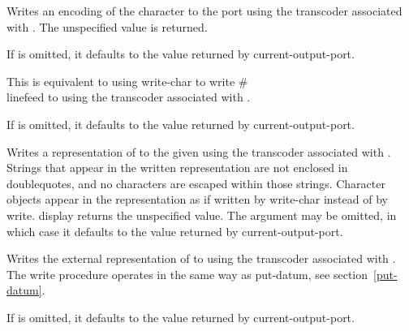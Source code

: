 \begin{entry}{%
}

Writes an encoding of the character  to the port using the
transcoder associated with . The unspecified value is
returned.

If  is omitted, it defaults to the value returned by
{\cf current-output-port}.
\end{entry}

\begin{entry}{%
}

This is equivalent to using {\cf write-char} to write {\cf \#\\linefeed}
to  using the transcoder associated with .

If  is omitted, it defaults to the value returned by
{\cf current-output-port}.
\end{entry}

\begin{entry}{%
}

Writes a representation of  to the given  using the
transcoder associated with .  Strings that appear in
the written representation are not enclosed in doublequotes, and no
characters are escaped within those strings.  Character objects appear
in the representation as if written by {\cf write-char} instead of by
{\cf write}.  {\cf display} returns the unspecified value.  The
 argument may be omitted, in which case it defaults
to the value returned by {\cf current-output-port}.
\end{entry}

\begin{entry}{%
}

Writes the external representation of  to 
using the transcoder associated with .  The {\cf write}
procedure operates in the same way as {\cf put-datum}, see
section~\ref{put-datum}.

If  is omitted, it defaults to the value returned by
{\cf current-output-port}.
\end{entry}


